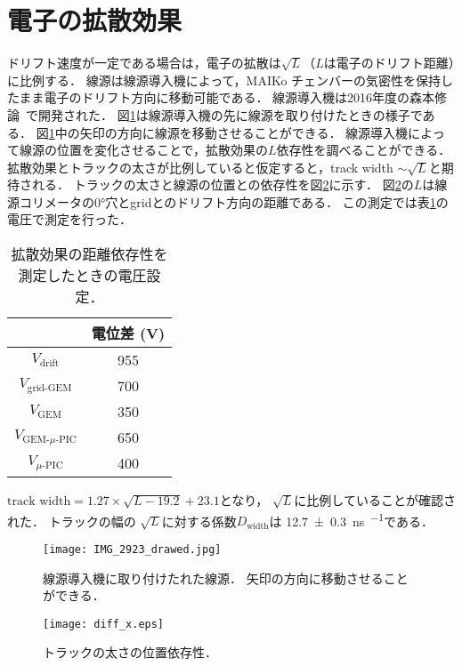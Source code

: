 \documentclass[../master]{subfiles}
\begin{document}
\section{電子の拡散効果}
ドリフト速度が一定である場合は，電子の拡散は$\sqrt{L}$（$L$は電子のドリフト距離）に比例する．
線源は線源導入機によって，MAIKo チェンバーの気密性を保持したまま電子のドリフト方向に移動可能である．
線源導入機は2016年度の森本修論~\cite{morimoto_thesis}で開発された．
図\ref{pic::source_insirtion}は線源導入機の先に線源を取り付けたときの様子である．
図\ref{pic::source_insirtion}中の矢印の方向に線源を移動させることができる．
線源導入機によって線源の位置を変化させることで，拡散効果の$L$依存性を調べることができる．
拡散効果とトラックの太さが比例していると仮定すると，track width $\sim\sqrt{L}$と期待される．
トラックの太さと線源の位置との依存性を図\ref{fig::diff_x}に示す．
図\ref{fig::diff_x}の$L$は線源コリメータの\ang{0}穴とgridとのドリフト方向の距離である．
この測定では表\ref{tab::config_diffusion_meas}の電圧で測定を行った．
\begin{table}
  \centering
  \caption{拡散効果の距離依存性を測定したときの電圧設定．}
  \label{tab::config_diffusion_meas}
  \begin{tabular}{cc}
    \toprule
    & 電位差 (\si{\volt}) \\
    \midrule
    $V_{\text{drift}}$ & 955 \\
    $V_{\text{grid-GEM}}$ & 700 \\
    $V_{\text{GEM}}$ & 350 \\
    $V_{\text{GEM-$\mu$-PIC}}$ & 650 \\
    $V_{\mu\text{-PIC}}$ & 400 \\
    \bottomrule
  \end{tabular}
\end{table}

$\text{track width} = 1.27\times\sqrt{L-19.2}+23.1$となり，
$\sqrt{L}$に比例していることが確認された．
トラックの幅の $\sqrt{L}$に対する係数$D_{\text{width}}$は
\SI{12.7\pm0.3}{\nano\second\per\sqrt{\milli\metre}}である．
\begin{figure}
  \centering
  \texttt{[image: IMG\_2923\_drawed.jpg]}
  \caption[線源導入機に取り付けたれた線源．]
          {線源導入機に取り付けたれた線源．
          矢印の方向に移動させることができる．}
  \label{pic::source_insirtion}
\end{figure}
\begin{figure}
  \centering
  \texttt{[image: diff\_x.eps]}
  \caption{トラックの太さの位置依存性．}
  \label{fig::diff_x}
\end{figure}
\end{document}

